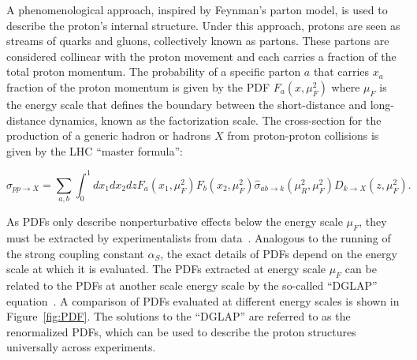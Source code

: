 A phenomenological approach, inspired by Feynman's parton model, is used to describe the proton's internal structure. Under this approach, protons are seen as streams of quarks and gluons, collectively known as partons. These partons are considered collinear with the proton movement and each carries a fraction of the total proton momentum. The probability of a specific parton $a$ that carries $x_{a}$ fraction of the proton momentum is given by the \ac{PDF} $F_{a}(x,\mu_{F}^2)$ where $\mu_{F}$ is the energy scale that defines the boundary between the short-distance and long-distance dynamics, known as the factorization scale. The cross-section for the production of a generic hadron or hadrons $X$ from proton-proton collisions is given by the \ac{LHC} ``master formula'':

\begin{equation}
\label{eq:master}
\sigma_{pp\rightarrow X}=\sum_{a,b}\int_{0}^{1}dx_{1}dx_{2}dzF_{a}(x_{1},\mu_{F}^2)F_{b}(x_{2},\mu_{F}^2)\hat{\sigma}_{ab\rightarrow k}(\mu_{R}^2,\mu_{F}^2)D_{k\rightarrow X}(z,\mu_{F}^2).
\end{equation} 

As \acp{PDF} only describe nonperturbative effects below the energy scale $\mu_{F}$, they must be extracted by experimentalists from data~\cite{NNPDF:2014otw,NNPDF:2017mvq}. Analogous to the running of the strong coupling constant $\alpha_{S}$, the exact details of \acp{PDF} depend on the energy scale at which it is evaluated. The \acp{PDF} extracted at energy scale $\mu_{F}$ can be related to the \acp{PDF} at another scale energy scale by the so-called ``DGLAP'' equation~\cite{Gribov:1971zn,Altarelli:1977zs,Dokshitzer:1977sg}. A comparison of \acp{PDF} evaluated at different energy scales is shown in Figure~\ref{fig:PDF}. The solutions to the ``DGLAP'' are referred to as the renormalized \acp{PDF}, which can be used to describe the proton structures universally across experiments. 

